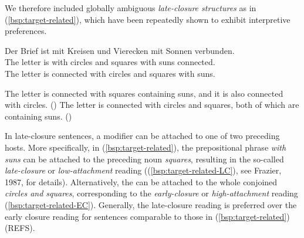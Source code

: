 \documentclass[fleqn,reqno,10pt,draft]{article}
\newcommand{\lc}{\acro{lc}}
\newcommand{\ec}{\acro{ec}}
\begin{document}
We therefore included globally ambiguous \emph{late-closure
  structures} as in (\ref{bsp:target-related}), which have been
repeatedly shown to exhibit interpretive preferences.
\begin{exe}
\ex \gll Der Brief ist mit Kreisen und Vierecken mit Sonnen
  verbunden. \label{bsp:target-related}\\
The letter is with circles and squares with suns connected.\\
The letter is connected with circles and squares with suns.
\begin{xlist}
  \ex \label{bsp:target-related-LC} The letter is connected with squares containing suns, and it is
    also connected with circles. \hfill{(\lc)}
  \ex \label{bsp:target-related-EC} The letter is connected with circles and squares, both of which
    are containing suns.  \hfill{(\ec)} 
\end{xlist}
\end{exe}
In late-closure sentences, a modifier can be attached to one of two
preceding hosts. More specifically, in (\ref{bsp:target-related}), the
prepositional phrase \emph{with suns} can be attached to the preceding
noun \emph{squares}, resulting in the so-called \emph{late-closure} or
\emph{low-attachment} reading ((\ref{bsp:target-related-LC}), see
Frazier, 1987, for details). Alternatively, the
 can be attached to the whole conjoined 
\emph{circles and squares}, corresponding to the \emph{early-closure}
or \emph{high-attachment} reading
(\ref{bsp:target-related-EC}). Generally, the late-closure reading is
preferred over the early closure reading for sentences comparable to
those in (\ref{bsp:target-related}) (REFS).
\end{document}
